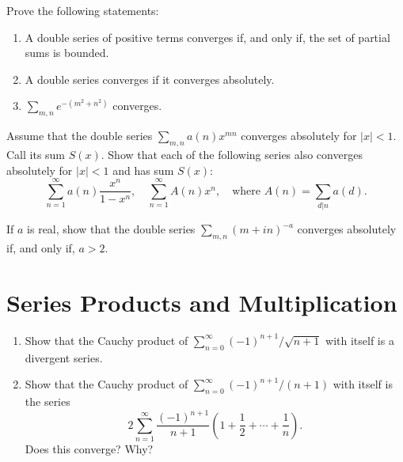 \begin{problembox}
Prove the following statements:
\begin{enumerate}[label=\alph*)]
\item A double series of positive terms converges if, and only if, the set of partial sums is bounded.
\item A double series converges if it converges absolutely.
\item \(\sum_{m,n} e^{-(m^2+n^2)}\) converges.
\end{enumerate}
\end{problembox}



\begin{problembox}
Assume that the double series \(\sum_{m,n} a(n)x^{mn}\) converges absolutely for \(|x| < 1\). Call its sum \(S(x)\). Show that each of the following series also converges absolutely for \(|x| < 1\) and has sum \(S(x)\):
\[\sum_{n=1}^{\infty} a(n) \frac{x^n}{1 - x^n}, \quad \sum_{n=1}^{\infty} A(n)x^n, \quad \text{where } A(n) = \sum_{d|n} a(d).\]
\end{problembox}



\begin{problembox}
If \(a\) is real, show that the double series \(\sum_{m,n} (m + i n)^{-a}\) converges absolutely if, and only if, \(a > 2\).
\end{problembox}

\section{Series Products and Multiplication}



\begin{problembox}
\begin{enumerate}[label=\alph*)]
\item Show that the Cauchy product of \(\sum_{n=0}^{\infty} (-1)^{n+1}/\sqrt{n + 1}\) with itself is a divergent series.
\item Show that the Cauchy product of \(\sum_{n=0}^{\infty} (-1)^{n+1}/(n + 1)\) with itself is the series
\[2 \sum_{n=1}^{\infty} \frac{(-1)^{n+1}}{n + 1} \left( 1 + \frac{1}{2} + \cdots + \frac{1}{n} \right).\]
Does this converge? Why?
\end{enumerate}
\end{problembox}




